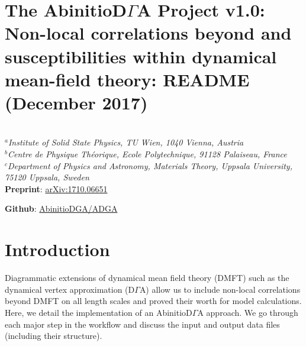 \documentclass[a4paper,11pt]{article}
\numberwithin{equation}{section} %
\begin{document}
\section*{The AbinitioD$\Gamma$A Project v1.0: Non-local correlations beyond and susceptibilities within dynamical mean-field theory: README (December 2017)}
\begin{framed}
\\
\center\textit{{$^a$Institute of Solid State Physics, TU Wien, 1040 Vienna, Austria\\
$^b$Centre de Physique Théorique, Ecole Polytechnique, 91128 Palaiseau, France\\
$^c$Department of Physics and Astronomy, Materials Theory, Uppsala University, 75120 Uppsala, Sweden}}
\\[1\baselineskip]
\textbf{Preprint}: \href{https://arxiv.org/abs/1710.06651}{arXiv:1710.06651}

\textbf{Github}: \href{https://github.com/AbinitioDGA/ADGA}{AbinitioDGA/ADGA}
\end{framed}

\section{Introduction}
Diagrammatic extensions of dynamical mean field theory (DMFT) such as the dynamical vertex approximation (D$\Gamma$A) allow us to include non-local correlations beyond DMFT on all length scales and proved their worth for model calculations. Here, we detail the implementation of an AbinitioD$\Gamma$A approach. We go through each major step in the workflow and discuss the input and output data files (including their structure).

\end{document}
